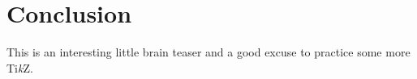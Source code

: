 \section{Conclusion}
\label{sec:conclusion}

This is an interesting little brain teaser and a good excuse to practice some
more Ti\textit{k}Z.
